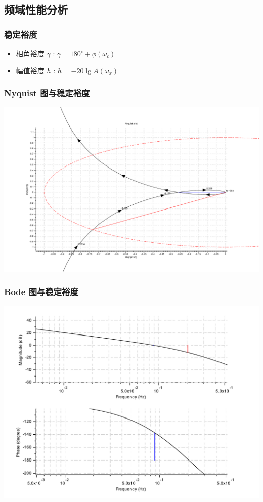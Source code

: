 \documentclass[table]{beamer}
\begin{document}
\subsection{频域性能分析}
\label{sec-5-1}
\begin{frame}
\frametitle{稳定裕度}
\label{sec-5-1-1}

\begin{itemize}
\item 相角裕度 $\gamma$ : $\gamma=180^{\circ}+\phi(\omega_c)$
\item 幅值裕度 $h$ : $h=-20\lg A(\omega_x)$
\end{itemize}
\end{frame}
\begin{frame}
\frametitle{Nyquist 图与稳定裕度}
\label{sec-5-1-2}

\includegraphics[width=.9\linewidth]{image/margin_nyquist_scilab.pdf}
\end{frame}
\begin{frame}
\frametitle{Bode 图与稳定裕度}
\label{sec-5-1-3}

\includegraphics[width=.9\linewidth]{image/margin_bode_scilab.pdf}
\end{frame}
\end{document}
